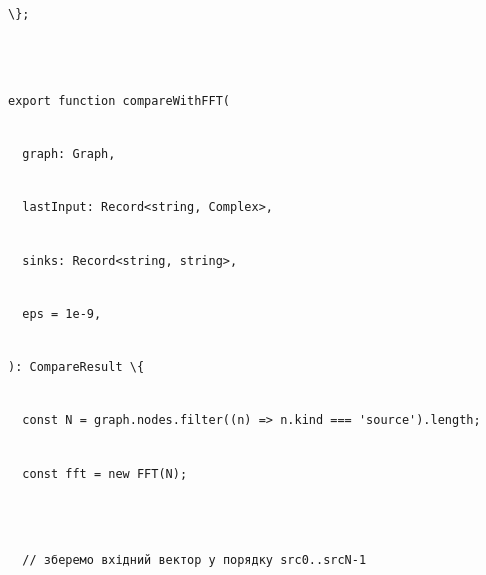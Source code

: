 \documentclass[
]{article}
\newcommand{\passthrough}[1]{#1}
\begin{document}
\passthrough{\lstinline!\};!}\strut \\
\strut \\
\passthrough{\lstinline!export!}\passthrough{\lstinline! !}\passthrough{\lstinline!function!}\passthrough{\lstinline! !}\passthrough{\lstinline!compareWithFFT!}\passthrough{\lstinline!(!}\strut \\
\passthrough{\lstinline!  !}\passthrough{\lstinline!graph:!}\passthrough{\lstinline! !}\passthrough{\lstinline!Graph,!}\strut \\
\passthrough{\lstinline!  !}\passthrough{\lstinline!lastInput!}\passthrough{\lstinline!:!}\passthrough{\lstinline! !}\passthrough{\lstinline!Record<string,!}\passthrough{\lstinline! !}\passthrough{\lstinline!Complex>,!}\strut \\
\passthrough{\lstinline!  !}\passthrough{\lstinline!sinks:!}\passthrough{\lstinline! !}\passthrough{\lstinline!Record<string,!}\passthrough{\lstinline! !}\passthrough{\lstinline!string>,!}\strut \\
\passthrough{\lstinline!  !}\passthrough{\lstinline!eps!}\passthrough{\lstinline! !}\passthrough{\lstinline!=!}\passthrough{\lstinline! !}\passthrough{\lstinline!1e-9,!}\strut \\
\passthrough{\lstinline!):!}\passthrough{\lstinline! !}\passthrough{\lstinline!CompareResult!}\passthrough{\lstinline! !}\passthrough{\lstinline!\{!}\strut \\
\passthrough{\lstinline!  !}\passthrough{\lstinline!const!}\passthrough{\lstinline! !}\passthrough{\lstinline!N!}\passthrough{\lstinline! !}\passthrough{\lstinline!=!}\passthrough{\lstinline! !}\passthrough{\lstinline!graph.nodes.filter!}\passthrough{\lstinline!((n)!}\passthrough{\lstinline! !}\passthrough{\lstinline!=>!}\passthrough{\lstinline! !}\passthrough{\lstinline!n.kind!}\passthrough{\lstinline! !}\passthrough{\lstinline!===!}\passthrough{\lstinline! !}\passthrough{\lstinline!'source').length;!}\strut \\
\passthrough{\lstinline!  !}\passthrough{\lstinline!const!}\passthrough{\lstinline! !}\passthrough{\lstinline!fft!}\passthrough{\lstinline! !}\passthrough{\lstinline!=!}\passthrough{\lstinline! !}\passthrough{\lstinline!new!}\passthrough{\lstinline! !}\passthrough{\lstinline!FFT(N);!}\strut \\
\strut \\
\passthrough{\lstinline!  !}\passthrough{\lstinline!//!}\passthrough{\lstinline! !}\passthrough{\lstinline!зберемо!}\passthrough{\lstinline! !}\passthrough{\lstinline!вхідний!}\passthrough{\lstinline! !}\passthrough{\lstinline!вектор!}\passthrough{\lstinline! !}\passthrough{\lstinline!у!}\passthrough{\lstinline! !}\passthrough{\lstinline!порядку!}\passthrough{\lstinline! !}\passthrough{\lstinline!src0..srcN-1!}\strut \\
\end{document}
